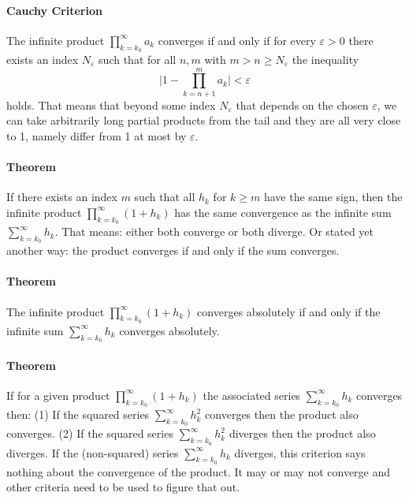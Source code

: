 
\paragraph{Cauchy Criterion} The infinite product $\prod_{k=k_0}^{\infty} a_k$ converges if and only if for every $\varepsilon > 0$ there exists an index $N_{\varepsilon}$ such that for all $n,m$ with $m > n \geq N_{\varepsilon}$ the inequality 
\begin{equation}
 \Bigg| 1 -\prod_{k=n+1}^{m} a_k \Bigg| < \varepsilon
\end{equation}
holds. That means that beyond some index $N_{\varepsilon}$ that depends on the chosen $\varepsilon$, we can take arbitrarily long partial products from the tail and they are all very close to 1, namely differ from 1 at most by $\varepsilon$.


\paragraph{Theorem} If there exists an index $m$ such that all $h_k$ for $k \geq m$ have the same sign, then the infinite product $\prod_{k=k_0}^{\infty} (1 + h_k)$ has the same convergence as the infinite sum $\sum_{k=k_0}^{\infty} h_k$. That means: either both converge or both diverge. Or stated yet another way: the product converges if and only if the sum converges. 

\paragraph{Theorem} The infinite product $\prod_{k=k_0}^{\infty} (1 + h_k)$ converges absolutely if and only if  the infinite sum $\sum_{k=k_0}^{\infty} h_k$ converges absolutely.

\paragraph{Theorem} If for a given product $\prod_{k=k_0}^{\infty} (1 + h_k)$ the associated series  $\sum_{k=k_0}^{\infty} h_k$ converges then: (1) If the squared series $\sum_{k=k_0}^{\infty} h_k^2$ converges then the product also converges.  (2) If the squared series $\sum_{k=k_0}^{\infty} h_k^2$ diverges then the product also diverges. If the (non-squared) series $\sum_{k=k_0}^{\infty} h_k$ diverges, this criterion says nothing about the convergence of the product. It may or may not converge and other criteria need to be used to figure that out.




